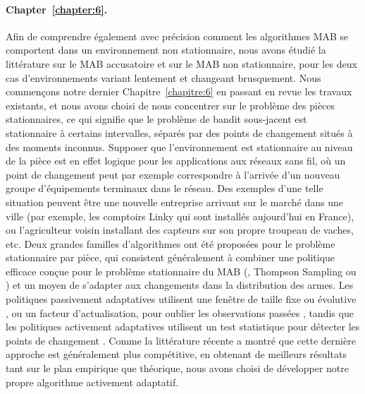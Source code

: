 \begin{resume_fr}
\paragraph{Chapter~\ref{chapter:6}.}
%
Afin de comprendre également avec précision comment les algorithmes MAB se comportent dans un environnement non stationnaire, nous avons étudié la littérature sur le MAB accusatoire et sur le MAB non stationnaire, pour les deux cas d'environnements variant lentement et changeant brusquement.
Nous commençons notre dernier Chapitre~\ref{chapitre:6} en passant en revue les travaux existants,
et nous avons choisi de nous concentrer sur le problème des pièces stationnaires,
ce qui signifie que le problème de bandit sous-jacent est stationnaire à certains intervalles, séparés par des points de changement situés à des moments inconnus.
Supposer que l'environnement est stationnaire au niveau de la pièce est en effet logique pour les applications aux réseaux sans fil, où un point de changement peut par exemple correspondre à l'arrivée d'un nouveau groupe d'équipements terminaux dans le réseau. Des exemples d'une telle situation peuvent être une nouvelle entreprise arrivant sur le marché dans une ville (par exemple, les comptoirs Linky qui sont installés aujourd'hui en France), ou l'agriculteur voisin installant des capteurs sur son propre troupeau de vaches, etc.
%
Deux grandes familles d'algorithmes ont été proposées pour le problème stationnaire par pièce,
qui consistent généralement à combiner une politique efficace conçue pour le problème stationnaire du MAB (\eg, Thompson Sampling ou \klUCB) et un moyen de s'adapter aux changements dans la distribution des armes.
Les politiques passivement adaptatives utilisent une fenêtre de taille fixe ou évolutive \cite{Garivier11UCBDiscount}, ou un facteur d'actualisation, pour oublier les observations passées \cite{Kocsis06,Gupta11thompson},
tandis que les politiques activement adaptatives utilisent un test statistique pour détecter les points de changement \cite{MellorShapiro13,Allesiardo15}.
%
Comme la littérature récente a montré que cette dernière approche est généralement plus compétitive, en obtenant de meilleurs résultats tant sur le plan empirique que théorique, nous avons choisi de développer notre propre algorithme activement adaptatif.


\end{resume_fr}
